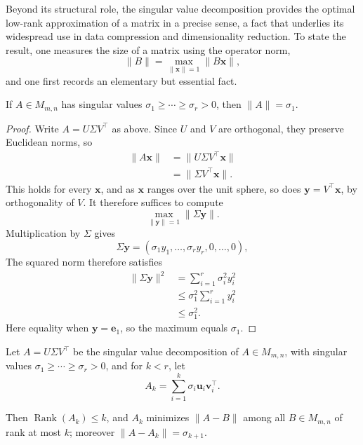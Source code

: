Beyond its structural role, the singular value decomposition provides the optimal low-rank approximation of a matrix in a precise sense, a fact that underlies its widespread use in data compression and dimensionality reduction. To state the result, one measures the size of a matrix using the operator norm,
\[
\|B\| = \max_{\|\mathbf{x}\|=1} \|B\mathbf{x}\|,
\]
and one first records an elementary but essential fact.

\begin{theorem}
If $A \in M_{m,n}$ has singular values $\sigma_1 \geq \cdots \geq \sigma_r > 0$, then $\|A\| = \sigma_1$.
\end{theorem}

\begin{proof}
Write $A = U\Sigma V^{\top}$ as above. Since $U$ and $V$ are orthogonal, they preserve Euclidean norms, so
\[
\begin{aligned}
\|A\mathbf{x}\| &= \|U\Sigma V^{\top}\mathbf{x}\| \\
&= \|\Sigma V^{\top}\mathbf{x}\|.
\end{aligned}
\]
This holds for every $\mathbf{x}$, and as $\mathbf{x}$ ranges over the unit sphere, so does $\mathbf{y} = V^{\top}\mathbf{x}$, by orthogonality of $V$. It therefore suffices to compute
\[
\max_{\|\mathbf{y}\|=1} \|\Sigma \mathbf{y}\|.
\]
Multiplication by $\Sigma$ gives
\[
\Sigma \mathbf{y} = (\sigma_1 y_1, \dots, \sigma_r y_r, 0, \dots, 0),
\]
The squared norm therefore satisfies
\[
\begin{aligned}
\|\Sigma\mathbf{y}\|^2 &= \sum_{i=1}^{r} \sigma_i^2 y_i^2 \\
&\leq \sigma_1^2 \sum_{i=1}^{r} y_i^2 \\
&\leq \sigma_1^2.
\end{aligned}
\]
Here equality when $\mathbf{y} = \mathbf{e}_1$, so the maximum equals $\sigma_1$.
\end{proof}

\begin{theorem}
Let $A = U\Sigma V^{\top}$ be the singular value decomposition of $A \in M_{m,n}$, with singular values $\sigma_1 \geq \cdots \geq \sigma_r > 0$, and for $k < r$, let
\[
A_k = \sum_{i=1}^{k} \sigma_i \mathbf{u}_i \mathbf{v}_i^{\top}.
\]

Then $\operatorname{Rank}(A_k) \leq k$, and $A_k$ minimizes $\|A - B\|$ among all $B \in M_{m,n}$ of rank at most $k$; moreover $\|A - A_k\| = \sigma_{k+1}$.
\end{theorem}


